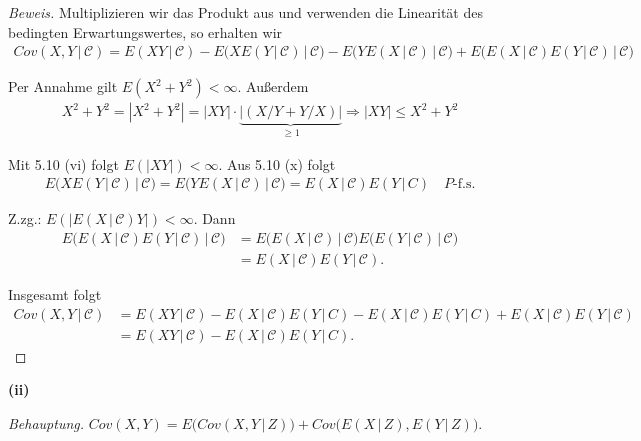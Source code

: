 \documentclass[10pt]{article}
\newcommand{\C}{\mathcal{C}}
\newcommand{\gap}{\,\vert\,}
\newcommand{\beh}{\textit{Behauptung. }}
\begin{document}
\begin{proof}[Beweis]  
	Multiplizieren wir das Produkt aus und verwenden die Linearität des bedingten Erwartungswertes, so erhalten wir
	\begin{align*}
		Cov(X,Y \gap \C) = E(XY \gap \C) - E\big(XE(Y \gap \C) \gap \C \big) - E\big(YE(X \gap \C) \gap \C \big) 
																			 + E\big( E(X \gap \C)E(Y \gap \C) \gap \C \big)
	\end{align*}

	Per Annahme gilt $E(X^2 + Y^2) < \infty$. Außerdem
	\begin{align*}
		X^2+Y^2 = |X^2+Y^2| = |XY|\cdot \underbrace{|(X/Y + Y/X)|}_{\geq 1} \Longrightarrow |XY| \leq X^2+Y^2 
	\end{align*} 

	Mit 5.10 (vi) folgt $E(|XY|) < \infty$. Aus 5.10 (x) folgt 
	\begin{align*}
		E\big(XE(Y \gap \C) \gap \C \big) = E\big(YE(X \gap \C) \gap \C \big) = E(X \gap \C) E(Y \gap C) \quad\text{$P$-f.s.}
	\end{align*}

	Z.zg.: $E(|E(X\gap \C)Y|) < \infty$. Dann 
	\begin{align*}
		E\big( E(X \gap \C)E(Y \gap \C) \gap \C \big) &= E\big( E(X \gap \C) \gap \C \big)E\big( E(Y \gap \C) \gap \C \big) \\
													  &= E(X \gap \C) E(Y \gap \C).
	\end{align*}

	Insgesamt folgt 
	\begin{align*}
		Cov(X,Y \gap \C) &= E(XY \gap \C) - E(X \gap \C) E(Y \gap C) - E(X \gap \C) E(Y \gap C) + E(X \gap \C) E(Y \gap \C) \\
						 &= E(XY \gap \C) - E(X \gap \C) E(Y \gap C).
	\end{align*}
\end{proof}

\newpage

\textbf{(ii)}

\beh $Cov(X,Y) = E\big(Cov(X,Y \gap Z)\big) + Cov\big(E(X \gap Z), E(Y \gap Z)\big)$.
\end{document}
